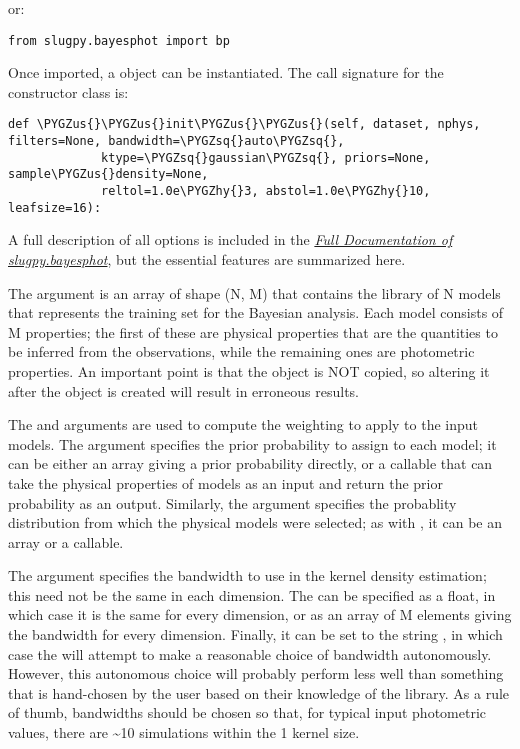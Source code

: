 \documentclass[letterpaper,10pt,english]{sphinxmanual}
\def\PYGZus{\char`\_}
\def\PYGZhy{\char`\-}
\def\PYGZsq{\char`\'}
\renewcommand\PYGZsq{\textquotesingle}
\begin{document}
or:

\begin{Verbatim}[commandchars=\\\{\}]
from slugpy.bayesphot import bp
\end{Verbatim}

Once imported, a  object can be instantiated. The call signature for the  constructor class is:

\begin{Verbatim}[commandchars=\\\{\}]
def \PYGZus{}\PYGZus{}init\PYGZus{}\PYGZus{}(self, dataset, nphys, filters=None, bandwidth=\PYGZsq{}auto\PYGZsq{},
             ktype=\PYGZsq{}gaussian\PYGZsq{}, priors=None, sample\PYGZus{}density=None,
             reltol=1.0e\PYGZhy{}3, abstol=1.0e\PYGZhy{}10, leafsize=16):
\end{Verbatim}

A full description of all options is included in the {\hyperref[bayesphot:ssec-slugpy-bayesphot]{\emph{Full Documentation of slugpy.bayesphot}}}, but the essential features are summarized here.

The argument  is an array of shape (N, M) that contains the library of N models that represents the training set for the Bayesian analysis. Each model consists of M properties; the first  of these are physical properties that are the quantities to be inferred from the observations, while the remaining ones are photometric properties. An important point is that the  object is NOT copied, so altering it after the  object is created will result in erroneous results.

The  and  arguments are used to compute the weighting to apply to the input models. The  argument specifies the prior probability to assign to each model; it can be either an array giving a prior probability directly, or a callable that can take the physical properties of models as an input and return the prior probability as an output. Similarly, the  argument specifies the probablity distribution from which the physical models were selected; as with , it can be an array or a callable.

The  argument specifies the bandwidth to use in the kernel density estimation; this need not be the same in each dimension. The  can be specified as a float, in which case it is the same for every dimension, or as an array of M elements giving the bandwidth for every dimension. Finally, it can be set to the string , in which case the  will attempt to make a reasonable choice of bandwidth autonomously. However, this autonomous choice will probably perform less well than something that is hand-chosen by the user based on their knowledge of the library. As a rule of thumb, bandwidths should be chosen so that, for typical input photometric values, there are \textasciitilde{}10 simulations within the 1 kernel size.
\end{document}
